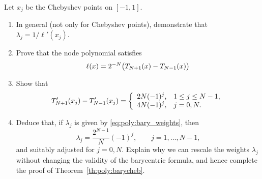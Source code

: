 \begin{exercise}
   \label{exr:poly:bary}
   Let $x_j$ be the Chebyshev points on $[-1,1]$.
   \begin{enumerate} \ilist
   \item In general (not only for Chebyshev points), demonstrate that $\lambda_j
      = 1 / \ell'(x_j)$.
   \item Prove that the node polynomial satisfies 
   \[
      \ell(x) = 2^{-N} \big(T_{N+1}(x) - T_{N-1}(x)\big)
   \]
   \item Show that 
   \[
      T_{N+1}'(x_j) - T_{N-1}'(x_j) = 
      \left\{ \begin{array}{ll}  
         2N(-1)^j, & 1 \leq j \leq N-1, \\
         4N(-1)^j, & j = 0, N.
       \end{array} \right.
   \]
   \item Deduce that, if $\lambda_j$ is given by \eqref{eq:poly:bary_weights}, then 
   \[
      \lambda_j = \frac{2^{N-1}}{N} (-1)^j, \qquad j = 1, \dots, N-1,
   \]
   and suitably adjusted for $j = 0, N$. Explain why we can rescale the weights
   $\lambda_j$ without changing the validity of the barycentric formula, and
   hence complete the proof of Theorem~\ref{th:poly:barycheb}.
   \qedhere
   \end{enumerate}
\end{exercise}


